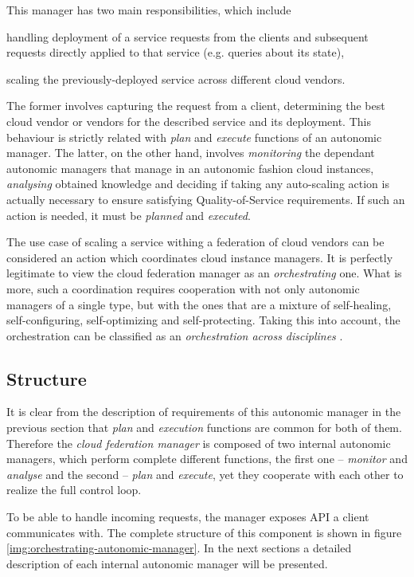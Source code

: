 This manager has two main responsibilities, which include
\begin{inparaenum}[1)]
\item handling deployment of a service requests from the clients and subsequent requests directly applied to that service (e.g. queries about its state), 
\item scaling the previously-deployed service across different cloud vendors.
\end{inparaenum}
The former involves capturing the request from a client, determining the best cloud vendor or vendors for the described service and its deployment. This behaviour is strictly related with \emph{plan} and \emph{execute} functions of an autonomic manager. The latter, on the other hand, involves \emph{monitoring} the dependant autonomic managers that manage in an autonomic fashion cloud instances, \emph{analysing} obtained knowledge and deciding if taking any auto-scaling action is actually necessary to ensure satisfying Quality-of-Service requirements. If such an action is needed, it must be \emph{planned} and \emph{executed}.

The use case of scaling a service withing a federation of cloud vendors can be considered an action which coordinates cloud instance managers. It is perfectly legitimate to view the cloud federation manager as an \emph{orchestrating} one. What is more, such a coordination requires cooperation with not only autonomic managers of a single type, but with the ones that are a mixture of self-healing, self-configuring, self-optimizing and self-protecting. Taking this into account, the orchestration can be classified as an \emph{orchestration across disciplines} \cite{IBM06}.

\subsection{Structure}
It is clear from the description of requirements of this autonomic manager in the previous section that \emph{plan} and \emph{execution} functions are common for both of them. Therefore the \emph{cloud federation manager} is composed of two internal autonomic managers, which perform complete different functions, the first one -- \emph{monitor} and \emph{analyse} and the second -- \emph{plan} and \emph{execute}, yet they cooperate with each other to realize the full control loop.

To be able to handle incoming requests, the manager exposes API a client communicates with. The complete structure of this component is shown in figure \ref{img:orchestrating-autonomic-manager}. In the next sections a detailed description of each internal autonomic manager will be presented.

